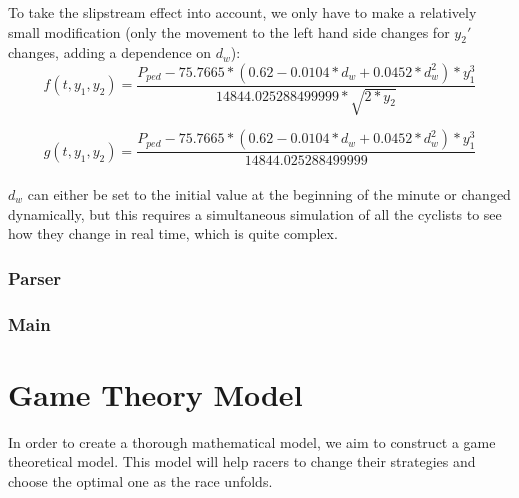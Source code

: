 \documentclass[10pt, a4paper]{report}
\begin{document}
To take the slipstream effect into account, we only have to make a relatively small modification (only the movement to the left hand side changes for $y_2'$ changes, adding a dependence on $d_w$):
$$ f(t, y_1, y_2) = \frac{P_{ped} - 75.7665 * (0.62 - 0.0104*d_w + 0.0452*d_w^2) * y_1 ^ 3}{14844.025288499999 * \sqrt{2 * y_2}}$$

$$ g( t, y_1, y_2 ) = \frac{P_{ped} - 75.7665 * (0.62 - 0.0104*d_w + 0.0452*d_w^2) * y_1 ^ 3}{14844.025288499999}$$ \\

$d_w$ can either be set to the initial value at the beginning of the minute or changed dynamically, but this requires a simultaneous simulation of all the cyclists to see how they change in real time, which is quite complex.

\subsubsection{Parser}

\subsubsection{Main}


\section{Game Theory Model}\label{sec:gameth}

In order to create a thorough mathematical model, we aim to construct a game theoretical model. This model will help racers to change their strategies and choose the optimal one as the race unfolds.\\
\end{document}
